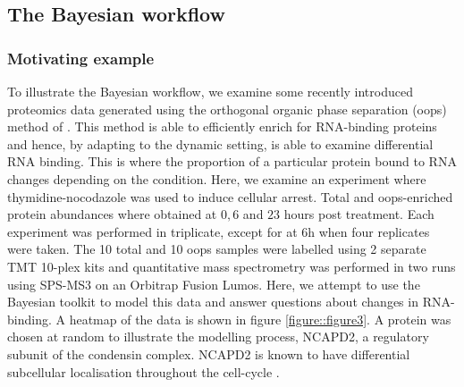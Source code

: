 \documentclass[12pt,english, journal=jpr, layout=twocolumn]{article}
\begin{document}
\subsection{The Bayesian workflow}
\subsubsection{Motivating example}
To illustrate the Bayesian workflow, we examine some recently introduced proteomics data generated using the 
orthogonal organic phase separation (oops) method of \citet{Queiroz::2019}. This method is able to efficiently enrich for RNA-binding proteins and hence, by adapting to the dynamic setting, is able to examine
differential RNA binding. This is where the proportion of a particular protein bound to RNA changes depending on the condition. Here, we examine an experiment where thymidine-nocodazole was used to induce cellular arrest. Total and oops-enriched protein abundances where obtained at $0,6$ and $23$ hours post treatment. Each experiment was performed in triplicate, except for at $6$h when four replicates were taken. The 10 total and 10 oops samples were labelled using 2 separate TMT 10-plex kits and quantitative mass spectrometry was performed in two runs using SPS-MS3 on an Orbitrap Fusion Lumos. Here, we attempt to use the Bayesian toolkit to model this data and answer questions about changes in RNA-binding. A heatmap of the data is shown in figure \ref{figure::figure3}. A protein was chosen at random to illustrate the modelling process, NCAPD2, a regulatory subunit of the condensin complex. NCAPD2 is known to have differential subcellular localisation throughout the cell-cycle \citep{Schmiesing::2000}. 
\end{document}
